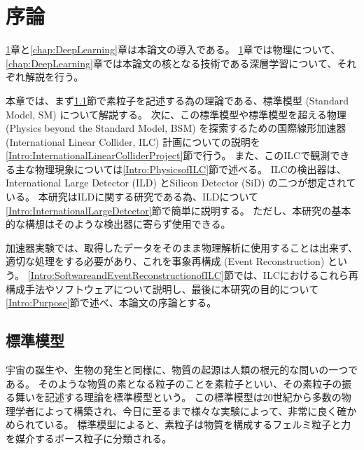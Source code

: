 
\chapter{序論} \label{chap:Introduction}

\ref{chap:Introduction}章と\ref{chap:DeepLearning}章は本論文の導入である。
\ref{chap:Introduction}章では物理について、\ref{chap:DeepLearning}章では本論文の核となる技術である深層学習について、それぞれ解説を行う。

本章では、まず\ref{Intro:StandardModel}節で素粒子を記述する為の理論である、標準模型 (Standard Model, SM) について解説する。
次に、この標準模型や標準模型を超える物理 (Physics beyond the Standard Model, BSM) を探索するための国際線形加速器 (International Linear Collider, ILC) 計画についての説明を\ref{Intro:InternationalLinearColliderProject}節で行う。
また、このILCで観測できる主な物理現象については\ref{Intro:PhysicsofILC}節で述べる。
ILCの検出器は、International Large Detector (ILD) とSilicon Detector (SiD) の二つが想定されている。
本研究はILDに関する研究である為、ILDについて\ref{Intro:InternationalLargeDetector}節で簡単に説明する。
ただし、本研究の基本的な構想はそのような検出器に寄らず使用できる。

加速器実験では、取得したデータをそのまま物理解析に使用することは出来ず、適切な処理をする必要があり、これを事象再構成 (Event Reconstruction) という。
\ref{Intro:SoftwareandEventReconstructionofILC}節では、ILCにおけるこれら再構成手法やソフトウェアについて説明し、最後に本研究の目的について\ref{Intro:Purpose}節で述べ、本論文の序論とする。

\section{標準模型} \label{Intro:StandardModel}

宇宙の誕生や、生物の発生と同様に、物質の起源は人類の根元的な問いの一つである。
そのような物質の素となる粒子のことを素粒子といい、その素粒子の振る舞いを記述する理論を標準模型という。
この標準模型は20世紀から多数の物理学者によって構築され、今日に至るまで様々な実験によって、非常に良く確かめられている。
標準模型によると、素粒子は物質を構成するフェルミ粒子と力を媒介するボース粒子に分類される。

